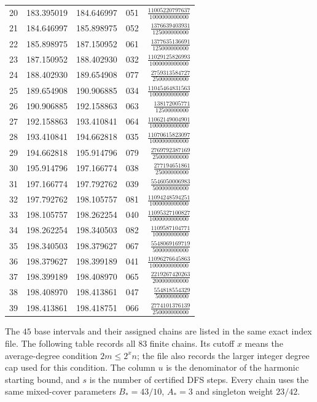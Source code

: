 \begin{longtable}{@{}rrrrr@{}}
20 & 183.395019 & 184.646997 & 051 & $\frac{11005220797637}{1000000000000}$\\[3pt]
21 & 184.646997 & 185.898975 & 052 & $\frac{1376639403931}{125000000000}$\\[3pt]
22 & 185.898975 & 187.150952 & 061 & $\frac{1377635136691}{125000000000}$\\[3pt]
23 & 187.150952 & 188.402930 & 032 & $\frac{11029125826993}{1000000000000}$\\[3pt]
24 & 188.402930 & 189.654908 & 077 & $\frac{2759313584727}{250000000000}$\\[3pt]
25 & 189.654908 & 190.906885 & 034 & $\frac{11045464831563}{1000000000000}$\\[3pt]
26 & 190.906885 & 192.158863 & 063 & $\frac{138172005771}{12500000000}$\\[3pt]
27 & 192.158863 & 193.410841 & 064 & $\frac{11062149004901}{1000000000000}$\\[3pt]
28 & 193.410841 & 194.662818 & 035 & $\frac{11070615823097}{1000000000000}$\\[3pt]
29 & 194.662818 & 195.914796 & 079 & $\frac{2769792387169}{250000000000}$\\[3pt]
30 & 195.914796 & 197.166774 & 038 & $\frac{277194651861}{25000000000}$\\[3pt]
31 & 197.166774 & 197.792762 & 039 & $\frac{5546050006983}{500000000000}$\\[3pt]
32 & 197.792762 & 198.105757 & 081 & $\frac{11094248594251}{1000000000000}$\\[3pt]
33 & 198.105757 & 198.262254 & 040 & $\frac{11095327100827}{1000000000000}$\\[3pt]
34 & 198.262254 & 198.340503 & 082 & $\frac{1109587104771}{100000000000}$\\[3pt]
35 & 198.340503 & 198.379627 & 067 & $\frac{5548069169719}{500000000000}$\\[3pt]
36 & 198.379627 & 198.399189 & 041 & $\frac{11096276645863}{1000000000000}$\\[3pt]
37 & 198.399189 & 198.408970 & 065 & $\frac{2219267420263}{200000000000}$\\[3pt]
38 & 198.408970 & 198.413861 & 047 & $\frac{554818554329}{50000000000}$\\[3pt]
39 & 198.413861 & 198.418751 & 066 & $\frac{2774101376139}{250000000000}$\\[3pt]
\bottomrule\end{longtable}
The $45$ base intervals and their assigned chains are listed in the same
exact index file. The following table records all $83$ finite chains. Its
cutoff $x$ means the average-degree condition $2m\le2^xn$; the file also
records the larger integer degree cap used for this condition. The column
$u$ is the denominator of the harmonic starting bound, and $s$ is the
number of certified DFS steps. Every chain uses the same mixed-cover
parameters $B_*=43/10$, $A_*=3$ and singleton weight $23/42$.

